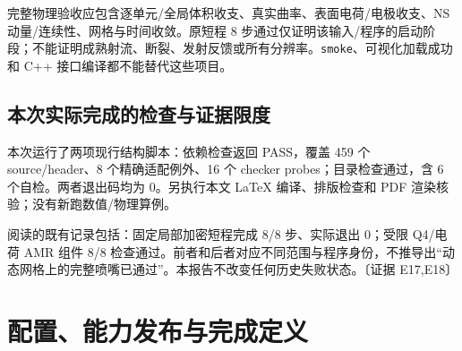 \documentclass[UTF8,a4paper,11pt,fontset=fandol]{ctexart}
\newcommand{\code}[1]{\nolinkurl{#1}}
\newcommand{\ev}[1]{{\small\color{muted}〔证据 #1〕}}
\begin{document}
完整物理验收应包含逐单元/全局体积收支、真实曲率、表面电荷/电极收支、NS 动量/连续性、网格与时间收敛。原短程 8 步通过仅证明该输入/程序的启动阶段；不能证明成熟射流、断裂、发射反馈或所有分辨率。\code{smoke}、可视化加载成功和 C++ 接口编译都不能替代这些项目。

\subsection{本次实际完成的检查与证据限度}
本次运行了两项现行结构脚本：依赖检查返回 PASS，覆盖 459 个 source/header、8 个精确适配例外、16 个 checker probes；目录检查通过，含 6 个自检。两者退出码均为 0。另执行本文 LaTeX 编译、排版检查和 PDF 渲染核验；没有新跑数值/物理算例。

阅读的既有记录包括：固定局部加密短程完成 8/8 步、实际退出 0；受限 Q4/电荷 AMR 组件 8/8 检查通过。前者和后者对应不同范围与程序身份，不推导出“动态网格上的完整喷嘴已通过”。本报告不改变任何历史失败状态。\ev{E17,E18}

\section{配置、能力发布与完成定义}
\end{document}
